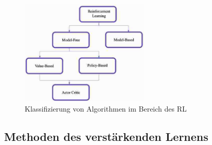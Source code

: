\begin{figure}[htb]
    \centering
    \includegraphics[height=5cm]{lib/graphics/taxonomy of RL algorithms.png}
    \caption[Klassifizierung von Algorithmen im Bereich des RL]{Klassifizierung von Algorithmen im Bereich des RL\footnotemark}
    \label{abb:RL-algorithm-classification}
\end{figure}

\subsection{Methoden des verstärkenden Lernens}

